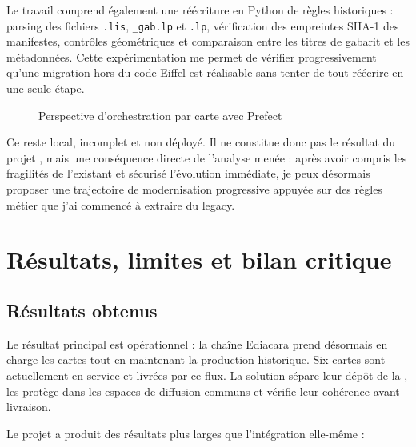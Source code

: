 Le travail comprend également une réécriture en Python de règles historiques : parsing des fichiers \texttt{.lis}, \texttt{\_gab.lp} et \texttt{.lp}, vérification des empreintes SHA-1 des manifestes, contrôles géométriques et comparaison entre les titres de gabarit et les métadonnées. Cette expérimentation me permet de vérifier progressivement qu'une migration hors du code Eiffel est réalisable sans tenter de tout réécrire en une seule étape.

\begin{figure}[H]
\centering
{}
\caption{Perspective d'orchestration par carte avec Prefect}
\label{fig:prefect-perspective-fcu}
\end{figure}

Ce  reste local, incomplet et non déployé. Il ne constitue donc pas le résultat du projet , mais une conséquence directe de l'analyse menée : après avoir compris les fragilités de l'existant et sécurisé l'évolution immédiate, je peux désormais proposer une trajectoire de modernisation progressive appuyée sur des règles métier que j'ai commencé à extraire du legacy.

\section{Résultats, limites et bilan critique}

\subsection{Résultats obtenus}

Le résultat principal est opérationnel : la chaîne Ediacara prend désormais en charge les cartes  tout en maintenant la production historique. Six cartes  sont actuellement en service et livrées par ce flux. La solution sépare leur dépôt de la , les protège dans les espaces de diffusion communs et vérifie leur cohérence avant livraison.

Le projet a produit des résultats plus larges que l'intégration  elle-même :

